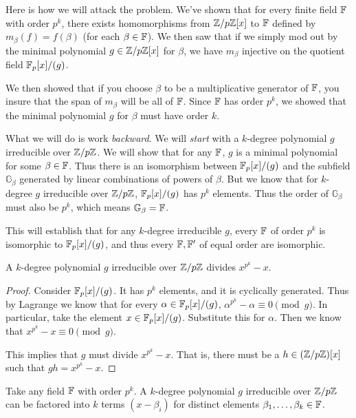 \begin{remark}
  Here is how we will attack the problem. We've shown that for every
  finite field $\mathbb{F}$ with order $p^k$, there exists homomorphisms from
  $\mathbb{Z} / p\mathbb{Z}[x]$ to $\mathbb{F}$ defined by $m_\beta(f) = f(\beta)$ (for each
  $\beta \in \mathbb{F}$). We then saw that if we simply mod out by the minimal
  polynomial $g \in \mathbb{Z} / p\mathbb{Z}[x]$ for $\beta$, we have $m_\beta$ injective
  on the quotient field $\mathbb{F}_p[x]/(g)$.

  We then showed that if you choose $\beta$ to be a multiplicative
  generator of $\mathbb{F}$, you insure that the span of $m_\beta$ will be all
  of $\mathbb{F}$. Since $\mathbb{F}$ has order $p^k$, we showed that the minimal
  polynomial $g$ for $\beta$ must have order $k$.

  What we will do is work \emph{backward}. We will \emph{start} with a
  $k$-degree polynomial $g$ irreducible over $\mathbb{Z} / p\mathbb{Z}$. We will show that
  for any $\mathbb{F}$, $g$ is a minimal polynomial for some $\beta \in \mathbb{F}$.
  Thus there is an isomorphism between $\mathbb{F}_p[x]/(g)$ and the subfield
  $\mathbb{G}_\beta$ generated by linear combinations of powers of
  $\beta$. But we know that for $k$-degree $g$ irreducible over
  $\mathbb{Z} / p\mathbb{Z}$, $\mathbb{F}_p[x]/(g)$ has $p^k$ elements. Thus the order of
  $\mathbb{G}_\beta$ must also be $p^k$, which means $\mathbb{G}_\beta =
  \mathbb{F}$.

  This will establish that for any $k$-degree irreducible $g$, every
  $\mathbb{F}$ of order $p^k$ is isomorphic to $\mathbb{F}_p[x]/(g)$, and thus every $\mathbb{F},
  \mathbb{F}'$ of equal order are isomorphic.
\end{remark}

\begin{lemma}
  A $k$-degree polynomial $g$ irreducible over $\mathbb{Z} / p\mathbb{Z}$ divides $x^{p^k}
  - x$.
\end{lemma}

\begin{proof}
  Consider $\mathbb{F}_p[x]/(g)$. It has $p^k$ elements, and it is cyclically
  generated. Thus by Lagrange we know that for every $\alpha \in
  \mathbb{F}_p[x]/(g)$, $\alpha^{p^k} - \alpha \equiv 0 \pmod g$. In particular, take
  the element $x \in \mathbb{F}_p[x]/(g)$. Substitute this for $\alpha$. Then we know
  that $x^{p^k} - x \equiv 0 \pmod g$.

  This implies that $g$ must divide $x^{p^k} - x$. That is, there must
  be a $h \in \mathopen{}\left( {\mathbb{Z} / p\mathbb{Z}} \right)\mathclose{}[x]$ such that $gh = x^{p^k} - x$.
\end{proof}

\begin{lemma}
  Take any field $\mathbb{F}$ with order $p^k$. A $k$-degree polynomial $g$
  irreducible over $\mathbb{Z} / p\mathbb{Z}$ can be factored into $k$ terms $(x -
  \beta_i)$ for distinct elements $\beta_1, \ldots, \beta_k \in \mathbb{F}$.
\end{lemma}

